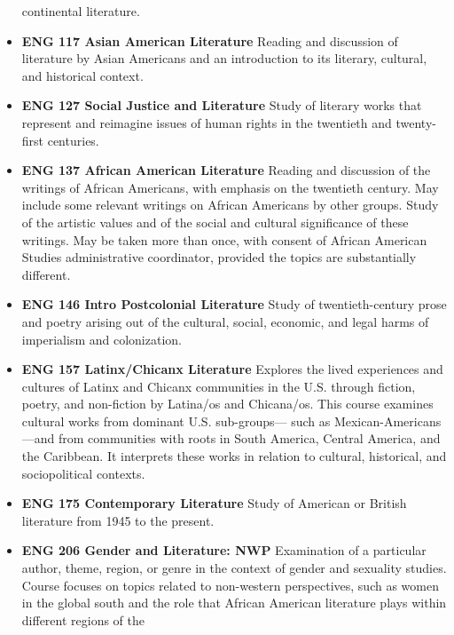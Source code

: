 \documentclass[
  letterpaper,
]{scrbook}
\begin{document}
\begin{itemize}
  continental literature.\\
\item
  \textbf{ENG 117 Asian American Literature} Reading and discussion of
  literature by Asian Americans and an introduction to its literary,
  cultural, and historical context.\\
\item
  \textbf{ENG 127 Social Justice and Literature} Study of literary works
  that represent and reimagine issues of human rights in the twentieth
  and twenty-first centuries.\\
\item
  \textbf{ENG 137 African American Literature} Reading and discussion of
  the writings of African Americans, with emphasis on the twentieth
  century. May include some relevant writings on African Americans by
  other groups. Study of the artistic values and of the social and
  cultural significance of these writings. May be taken more than once,
  with consent of African American Studies administrative coordinator,
  provided the topics are substantially different.\\
\item
  \textbf{ENG 146 Intro Postcolonial Literature} Study of
  twentieth-century prose and poetry arising out of the cultural,
  social, economic, and legal harms of imperialism and colonization.\\
\item
  \textbf{ENG 157 Latinx/Chicanx Literature} Explores the lived
  experiences and cultures of Latinx and Chicanx communities in the U.S.
  through fiction, poetry, and non-fiction by Latina/os and Chicana/os.
  This course examines cultural works from dominant U.S. sub-groups---
  such as Mexican-Americans---and from communities with roots in South
  America, Central America, and the Caribbean. It interprets these works
  in relation to cultural, historical, and sociopolitical contexts.\\
\item
  \textbf{ENG 175 Contemporary Literature} Study of American or British
  literature from 1945 to the present.\\
\item
  \textbf{ENG 206 Gender and Literature: NWP} Examination of a
  particular author, theme, region, or genre in the context of gender
  and sexuality studies. Course focuses on topics related to non-western
  perspectives, such as women in the global south and the role that
  African American literature plays within different regions of the

\end{itemize}
\end{document}
